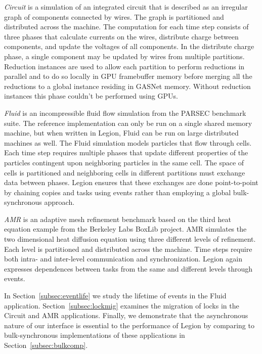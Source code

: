 {\em Circuit} is a simulation of an integrated circuit that is described as an
irregular graph of components connected by wires.  The graph is partitioned
and distributed across the machine.  The computation for each time step consists
of three phases that calculate currents on the wires, distribute charge between
components, and update the voltages of all components.  In the distribute charge
phase, a single component may be updated by wires from multiple partitions.  Reduction instances 
are used to allow each partition to perform reductions in parallel and to do so locally in GPU
framebuffer memory before merging all the reductions to a global instance
residing in GASNet memory.  Without reduction instances this phase
couldn't be performed using GPUs.

{\em Fluid} is an incompressible fluid flow simulation from the PARSEC
benchmark suite\cite{bienia11benchmarking}.  The reference implementation can 
only be run on a single shared memory machine, but when written in Legion, Fluid can
be run on large distributed machines as well.  The Fluid simulation
models particles that flow through cells.  Each time step requires multiple phases
that update different properties of the particles contingent upon neighboring
particles in the same cell.  The space of cells is partitioned and neighboring
cells in different partitions must exchange data between phases.  Legion ensures
that these exchanges are done point-to-point by chaining copies and tasks
using events rather than employing a global bulk-synchronous approach.

{\em AMR} is an adaptive mesh refinement benchmark based on the third heat
equation example from the Berkeley Labs BoxLib project\cite{BoxLib}.  AMR
simulates the two dimensional heat diffusion equation using three different levels
of refinement.  Each level is partitioned and distributed across the machine.  Time steps require
both intra- and inter-level communication and synchronization.  Legion again
expresses dependences between tasks from the same and different levels through
events.

In Section~\ref{subsec:eventlife} we study the lifetime of events in
the Fluid application.  Section~\ref{subsec:lockmig} examines
the migration of locks in the Circuit and AMR applications.  Finally, we demonstrate
that the asynchronous nature of our interface is essential to the
performance of Legion by comparing to bulk-synchronous
implementations of these applications in Section~\ref{subsec:bulkcomp}.
  
